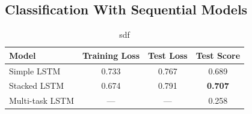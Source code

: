 %
%
%
%
%
%
%
%



\subsection{Classification With Sequential Models}
\label{sub:Classification With Sequential Models}


\begin{table}[h]
  \begin{center}
    \begin{tabular}{ l | c | c | c }
      \toprule
      Model & Training Loss & Test Loss & Test Score \\
      \midrule
      Simple LSTM & 0.733 & 0.767 & 0.689 \\
      Stacked LSTM & 0.674 & 0.791 & \textbf{0.707} \\
      Multi-task LSTM & --- & --- & 0.258 \\
      \bottomrule
    \end{tabular}
  \caption{sdf}
\label{tab:Paragraph Vector Parameter Hyper-Parameter Results}
\end{center}
\end{table}

